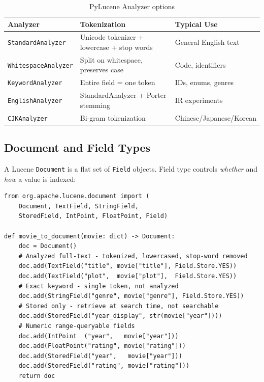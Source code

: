 \documentclass[11pt,a4paper]{article}
\begin{document}
\begin{table}[h]
\centering
\small
\begin{tabular}{@{}lll@{}}
\toprule
\textbf{Analyzer} & \textbf{Tokenization} & \textbf{Typical Use} \\
\midrule
\texttt{StandardAnalyzer}   & Unicode tokenizer + lowercase + stop words & General English text \\
\texttt{WhitespaceAnalyzer} & Split on whitespace, preserves case         & Code, identifiers    \\
\texttt{KeywordAnalyzer}    & Entire field = one token                    & IDs, enums, genres   \\
\texttt{EnglishAnalyzer}    & StandardAnalyzer + Porter stemming          & IR experiments       \\
\texttt{CJKAnalyzer}        & Bi-gram tokenization                        & Chinese/Japanese/Korean \\
\bottomrule
\end{tabular}
\caption{PyLucene Analyzer options}
\label{tab:analyzers}
\end{table}

\subsection{Document and Field Types}

A Lucene \texttt{Document} is a flat set of \texttt{Field} objects.
Field type controls \emph{whether} and \emph{how} a value is indexed:

\begin{lstlisting}[caption={Field types in a movie document (from \texttt{src/pylucene/indexing.py})}]
from org.apache.lucene.document import (
    Document, TextField, StringField,
    StoredField, IntPoint, FloatPoint, Field)

def movie_to_document(movie: dict) -> Document:
    doc = Document()
    # Analyzed full-text - tokenized, lowercased, stop-word removed
    doc.add(TextField("title", movie["title"], Field.Store.YES))
    doc.add(TextField("plot",  movie["plot"],  Field.Store.YES))
    # Exact keyword - single token, not analyzed
    doc.add(StringField("genre", movie["genre"], Field.Store.YES))
    # Stored only - retrieve at search time, not searchable
    doc.add(StoredField("year_display", str(movie["year"])))
    # Numeric range-queryable fields
    doc.add(IntPoint  ("year",   movie["year"]))
    doc.add(FloatPoint("rating", movie["rating"]))
    doc.add(StoredField("year",   movie["year"]))
    doc.add(StoredField("rating", movie["rating"]))
    return doc
\end{lstlisting}
\end{document}
